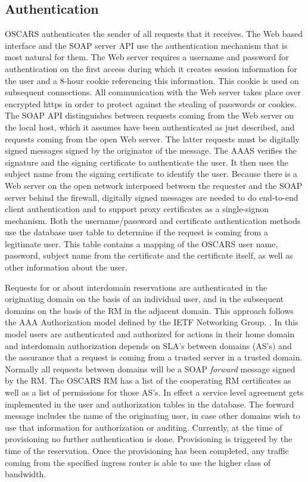 \documentclass[conference]{IEEEtran}
\begin{document}
\subsection{Authentication}
OSCARS authenticates the sender of all requests that it receives.
The Web based interface and the SOAP server API use the
authentication mechanism that is most natural for them. The Web server
requires a username and password for authentication on the first
access during which it creates session information for the user and a
8-hour cookie referencing this information. This cookie is used on subsequent
connections. All communication with the Web server takes place over
encrypted https in order to protect against the stealing of passwords
or cookies. The SOAP API distinguishes between requests coming from
the Web server on the local host, which it assumes have been authenticated
as just described, and requests coming from the open Web server. The 
latter requests  must be digitally signed messages \cite{XML-Signature} signed by the
originator of the message. The AAAS verifies the signature and the signing 
certificate to authenticate
the user. It then uses the subject name from the signing certificate
to identify the user. Because there is a Web server on the open network 
interposed between the
requester and the SOAP server behind the firewall, digitally signed messages 
are 
needed to do end-to-end client authentication and to support proxy certificates
as a single-signon mechanism. Both the username/password and certificate 
authentication methods use the database user table to
determine if the request is coming from a legitimate user. This table
contains a mapping of the OSCARS user name, password, subject name
from the certificate and the certificate itself, as well as other
information about the user.

Requests for or about interdomain
reservations are authenticated in the originating domain on the basis
of an individual user, and in the subsequent domains on the basis of
the RM in the adjacent domain.  This approach follows the AAA  Authorization
model defined by the IETF Networking Group. \cite{AAA}. In this model
users are authenticated and authorized for actions in their home domain and 
interdomain authorization depends on SLA's between domains (AS's) and the
assurance that  a request is coming from a trusted server in a trusted domain. Normally all requests between domains will be a SOAP \emph{forward}  message
signed by the RM. The OSCARS RM has a list of the
cooperating RM certificates as well as a list of
permissions for those AS's. In effect a service level agreement gets
implemented in the user and authorization tables in the database. The forward
message includes the name of the originating user, in case other
domains wish to use that information for authorization or auditing.
Currently, at the time of provisioning no further authentication is
done. Provisioning is triggered by the time of the reservation. Once
the provisioning has been completed, any traffic coming from the
specified ingress router is able to use the higher class of bandwidth.
\end{document}
